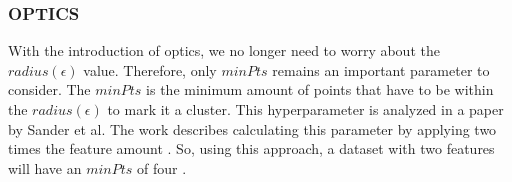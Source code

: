 \subsubsection{OPTICS} \label{theory:clustering-dbscan}
With the introduction of \gls{optics}, we no longer need to worry about the $radius(\epsilon)$ value.
Therefore, only $minPts$ remains an important parameter to consider. \newline
The $minPts$ is the minimum amount of points that have to be within the $radius(\epsilon)$ to mark it a cluster.
This hyperparameter is analyzed in a paper by Sander et al.
The work describes calculating this parameter by applying two times the feature amount \citep{sander_density-based_1998}.
So, using this approach, a dataset with two features will have an $minPts$ of four \citep{schubert_dbscan_2017}.
\newpage

